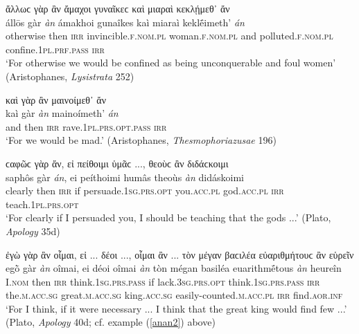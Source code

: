 \begin{exe}
\ex ἄλλωϲ γὰρ ἂν ἄμαχοι γυναῖκεϲ καὶ μιαραὶ κεκλῄμεθ᾽ ἄν\\
\gll állōs gàr \emph{àn} ámakhoi gunaîkes kaì miaraì keklḗimeth' \emph{án}\\
otherwise then \textsc{irr} invincible.\textsc{f.nom.pl} woman.\textsc{f.nom.pl} and polluted.\textsc{f.nom.pl} confine.\textsc{1pl.prf.pass} \textsc{irr}\\
\trans `For otherwise we would be confined as being unconquerable and foul women' (Aristophanes, \textit{Lysistrata} 252)
\label{garan11}
\end{exe}

\begin{exe}
\ex καὶ γὰρ ἂν μαινοίμεθ᾽ ἄν\\
\gll kaì gàr \emph{àn} mainoímeth' \emph{án}\\
and then \textsc{irr} rave.\textsc{1pl.prs.opt.pass} \textsc{irr}\\
\trans `For we would be mad.' (Aristophanes, \textit{Thesmophoriazusae} 196)
\label{garan12}
\end{exe}

\begin{exe}
\ex ϲαφῶϲ γὰρ ἄν, εἰ πείθοιμι ὑμᾶϲ ..., θεοὺϲ ἂν διδάϲκοιμι\\
\gll saphôs gàr \emph{án}, ei peíthoimi humâs theoùs \emph{àn} didáskoimi\\
clearly then \textsc{irr} if persuade.\textsc{1sg.prs.opt} you.\textsc{acc.pl} god.\textsc{acc.pl} \textsc{irr} teach.\textsc{1pl.prs.opt}\\
\trans `For clearly if I persuaded you, I should be teaching that the gods ...' (Plato, \textit{Apology} 35d)
\label{garan13}
\end{exe}

\begin{exe}
\ex ἐγὼ γὰρ ἂν οἶμαι, εἰ ... δέοι ..., οἶμαι ἂν ... τὸν μέγαν βαϲιλέα εὐαριθμήτουϲ ἂν εὑρεῖν\\
\gll egṑ gàr \emph{àn} oîmai, ei déoi oîmai \emph{àn} tòn mégan basiléa euarithmḗtous \emph{àn} heureîn\\
I.\textsc{nom} then \textsc{irr} think.\textsc{1sg.prs.pass} if lack.\textsc{3sg.prs.opt} think.\textsc{1sg.prs.pass} \textsc{irr} the.\textsc{m.acc.sg} great.\textsc{m.acc.sg} king.\textsc{acc.sg} easily-counted.\textsc{m.acc.pl} \textsc{irr} find.\textsc{aor.inf}\\
\trans `For I think, if it were necessary ... I think that the great king would find few ...' (Plato, \textit{Apology} 40d; cf. example (\ref{anan2}) above)
\label{garan14}
\end{exe}

